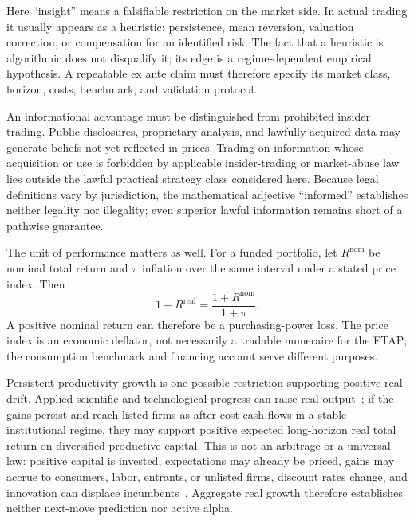 \documentclass[aps,pra,reprint,superscriptaddress,amsmath,amssymb,floatfix]{revtex4-2}
\theoremstyle{plain}
\theoremstyle{definition}
\theoremstyle{remark}
\begin{document}
Here ``insight'' means a falsifiable restriction on the market side. In actual
trading it usually appears as a heuristic: persistence, mean reversion,
valuation correction, or compensation for an identified risk. The fact that a
heuristic is algorithmic does not disqualify it; its edge is a regime-dependent
empirical hypothesis. A repeatable ex ante claim must therefore specify its
market class, horizon, costs, benchmark, and validation protocol.

An informational advantage must be distinguished from prohibited insider
trading. Public disclosures, proprietary analysis, and lawfully acquired data
may generate beliefs not yet reflected in prices. Trading on information whose
acquisition or use is forbidden by applicable insider-trading or market-abuse
law lies outside the lawful practical strategy class considered here. Because
legal definitions vary by jurisdiction, the mathematical adjective
``informed'' establishes neither legality nor illegality; even superior lawful
information remains short of a pathwise guarantee.

The unit of performance matters as well. For a funded portfolio, let
\(R^{\mathrm{nom}}\) be nominal total return and \(\pi\) inflation over the same
interval under a stated price index. Then
\begin{equation}
  1+R^{\mathrm{real}}
  =\frac{1+R^{\mathrm{nom}}}{1+\pi}.
  \label{eq:real-return}
\end{equation}
A positive nominal return can therefore be a purchasing-power loss. The price
index is an economic deflator, not necessarily a tradable numeraire for the
FTAP; the consumption benchmark and financing account serve different
purposes.

Persistent productivity growth is one possible restriction supporting
positive real drift. Applied scientific and technological progress can raise
real output~\cite{Solow1957}; if the gains persist and reach listed firms as
after-cost cash flows in a stable institutional regime, they may support
positive expected long-horizon real total return on diversified productive
capital. This is not an arbitrage or a universal law: positive capital is
invested, expectations may already be priced, gains may accrue to consumers,
labor, entrants, or unlisted firms, discount rates change, and innovation can
displace incumbents~\cite{Schumpeter1942}. Aggregate real growth therefore
establishes neither next-move prediction nor active alpha.
\end{document}
